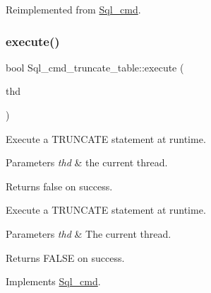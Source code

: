 Reimplemented from \mbox{\hyperlink{classSql__cmd_a57dad9cab4d6349656cf38a03131b58a}{Sql\+\_\+cmd}}.

\mbox{\label{classSql__cmd__truncate__table_ab47847ea764e186a542fb8fc834cdad2}} 
\subsubsection{\texorpdfstring{execute()}{execute()}}
{\footnotesize\ttfamily bool Sql\+\_\+cmd\+\_\+truncate\+\_\+table\+::execute (\begin{DoxyParamCaption}\item[{T\+HD $\ast$}]{thd }\end{DoxyParamCaption})\hspace{0.3cm}{\ttfamily [virtual]}}

Execute a T\+R\+U\+N\+C\+A\+TE statement at runtime. 
\begin{DoxyParams}{Parameters}
{\em thd} & the current thread. \\
\hline
\end{DoxyParams}
\begin{DoxyReturn}{Returns}
false on success.
\end{DoxyReturn}
Execute a T\+R\+U\+N\+C\+A\+TE statement at runtime.


\begin{DoxyParams}{Parameters}
{\em thd} & The current thread.\\
\hline
\end{DoxyParams}
\begin{DoxyReturn}{Returns}
F\+A\+L\+SE on success. 
\end{DoxyReturn}


Implements \mbox{\hyperlink{classSql__cmd_a213367b79b551296fbb7790f2a3732fb}{Sql\+\_\+cmd}}.

\mbox{\label{classSql__cmd__truncate__table_a5b4a65ae4c9c9efb13ae88ca3a96cfa5}} 
